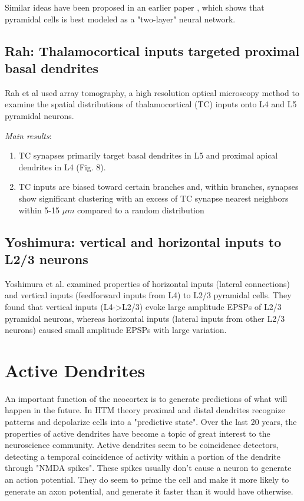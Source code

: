 \documentclass{article} %
\begin{document}
Similar ideas have been proposed in an earlier paper \cite{Poirazi2003}, which
shows that pyramidal cells is best modeled as a "two-layer" neural network. 

\subsection{Rah: Thalamocortical inputs targeted proximal basal dendrites}
Rah et al \cite{Rah2013} used array tomography, a high resolution optical 
microscopy method to examine the spatial distributions of thalamocortical (TC) 
inputs onto L4 and L5 pyramidal neurons. 

\emph{Main results}:
\begin{enumerate}
\item TC synapses primarily target basal dendrites in L5 and proximal apical
dendrites in L4 (Fig. 8).
\item TC inputs are biased toward certain branches and, within branches,
synapses show significant clustering with an excess of TC synapse nearest 
neighbors within 5-15 $\mu m$ compared to a random distribution
\end{enumerate}

\subsection{Yoshimura: vertical and horizontal inputs to L2/3 neurons}

Yoshimura et al. \cite{Yoshimura2000} examined properties of horizontal inputs 
(lateral connections) and vertical inputs (feedforward inputs from L4) to L2/3 
pyramidal cells. They found that vertical inputs (L4->L2/3) evoke large amplitude 
EPSPs of L2/3 pyramidal neurons, whereas horizontal inputs 
(lateral inputs from other L2/3 neurons) caused small amplitude EPSPs with 
large variation.

\section{Active Dendrites}

An important function of the neocortex is to generate predictions of what will
happen in the future. In HTM theory proximal and distal dendrites recognize
patterns and depolarize cells into a "predictive state". Over the last 20 years,
the properties of active dendrites have become a topic of great  interest to the
neuroscience community. Active dendrites seem to be coincidence detectors,
detecting a temporal coincidence of activity within a portion of the dendrite
through "NMDA spikes". These spikes usually don't cause a neuron to generate an
action potential. They do seem to prime the cell and make it more likely to
generate an axon potential, and generate it faster than it would have otherwise.
\end{document}
